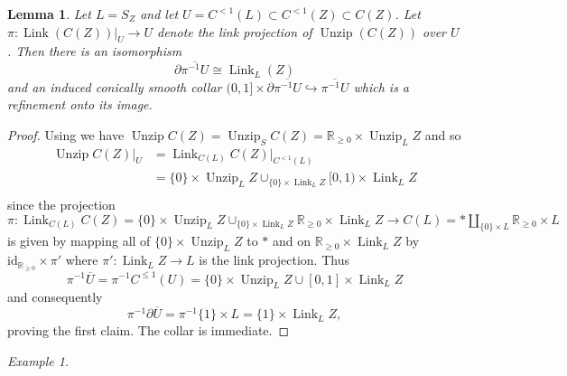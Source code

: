 \documentclass[11pt]{amsart}
\newcommand{\mbb}[1]{\mathbb{#1}}
\newcommand{\R}{\mbb{R}}
\newcommand{\id}{\mathrm{id}}
\DeclareMathOperator{\Unzip}{Unzip}
\DeclareMathOperator{\Link}{Link}
\numberwithin{equation}{section}
\theoremstyle{definition}
\theoremstyle{remark}
\newtheorem{example}[equation]{Example}
\theoremstyle{plain}
\newtheorem{lemma}[equation]{Lemma}
\begin{document}
\begin{lemma}\label{V6RIX5L}
    Let $L=S_Z$ and let $U=C^{<1}(L)\subset C^{<1}(Z)\subset C(Z)$. Let $\pi\colon \Link(C(Z))|_{U}\to U$ denote the link projection of $\Unzip (C(Z))$ over $U$. Then there is an isomorphism
    \[
        \partial\overline{\pi^{-1}U}\cong \Link_L(Z)
    \]
    and an induced conically smooth collar 
    \(
        (0,1]\times\partial\overline{\pi^{-1}U}\hookrightarrow \overline{\pi^{-1}U}
    \)
    which is a refinement onto its image.
\end{lemma}
\begin{proof}
    Using  we have $\Unzip C(Z)=\Unzip_{S}C(Z)=\R_{\geq0}\times\Unzip_L Z$ and so 
    \begin{align*}
        \Unzip C(Z)|_{U}&=\Link_{C(L)}C(Z)|_{C^{<1}(L)}\\
        &=\{0\}\times \Unzip_L Z\cup_{\{0\}\times\Link_LZ}[0,1)\times\Link_L Z\\
    \end{align*}
    since the projection $\pi\colon\Link_{C(L)}C(Z)=\{0\}\times\Unzip_L Z\cup_{\{0\}\times\Link_LZ}\R_{\geq0}\times \Link_L Z\to C(L)=\ast\amalg_{\{0\}\times L}\R_{\geq0}\times L$ is given by mapping all of $\{0\}\times\Unzip_L Z$ to $\ast$ and on $\R_{\geq0}\times \Link_LZ$ by $\id_{\R_{\geq0}}\times\pi'$ where $\pi'\colon \Link_LZ\to L$ is the link projection.
    Thus 
    \[
        \pi^{-1}\overline{U}=\pi^{-1}C^{\leq 1}(U)=\{0\}\times\Unzip_LZ\cup[0,1]\times\Link_LZ 
    \]
    and consequently 
    \begin{equation}\label{QX54WZB}
        \pi^{-1}\partial\overline{U}=\pi^{-1}\{1\}\times L=\{1\}\times\Link_L Z,
    \end{equation}
    proving the first claim. The collar is immediate.
\end{proof}

\begin{example}
    
\end{example}
\end{document}
